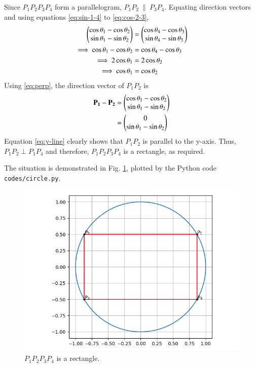 \documentclass[journal,12pt,twocolumn]{IEEEtran}
\renewcommand{\vec}[1]{\boldsymbol{\mathbf{#1}}}
\begin{document}
\begin{enumerate}
    Since $P_1P_2P_3P_4$ form a parallelogram, $P_1P_2\ \|\ P_3P_4$. Equating
    direction vectors and using equations \eqref{eq:sin-1-4} to \eqref{eq:cos-2-3},
    \begin{align}
        \begin{pmatrix}\cos\theta_1-\cos\theta_2\\\sin\theta_1-\sin\theta_2\end{pmatrix} &= 
        \begin{pmatrix}\cos\theta_4-\cos\theta_3\\\sin\theta_4-\sin\theta_3\end{pmatrix} \\
        \implies \cos\theta_1-\cos\theta_2 &= \cos\theta_4-\cos\theta_3 \\
        \implies 2\cos\theta_1&=2\cos\theta_2 \\
        \implies \cos\theta_1&=\cos\theta_2
        \label{eq:perp}
    \end{align}
    Using \eqref{eq:perp}, the direction vector of $P_1P_2$ is
    \begin{align}
        \vec{P_1} - \vec{P_2} &= \myvec{\cos\theta_1-\cos\theta_2\\\sin\theta_1-\sin\theta_2} \\
                              &= \myvec{0\\\sin\theta_1-\sin\theta_2}
                              \label{eq:y-line}
    \end{align}
    Equation \eqref{eq:y-line} clearly shows that $P_1P_2$ is parallel to the 
    y-axis. Thus, $P_1P_2 \perp P_1P_4$ and therefore, $P_1P_2P_3P_4$ is
    a rectangle, as required.

    The situation is demonstrated in Fig. \ref{fig:circle}, plotted by the Python
    code \texttt{codes/circle.py}.
    \begin{figure}[!ht]
        \centering
        \includegraphics[width=\columnwidth]{figs/circle.png}
        \caption{$P_1P_2P_3P_4$ is a rectangle.}
        \label{fig:circle}
    \end{figure}
\end{enumerate}
\end{document}
